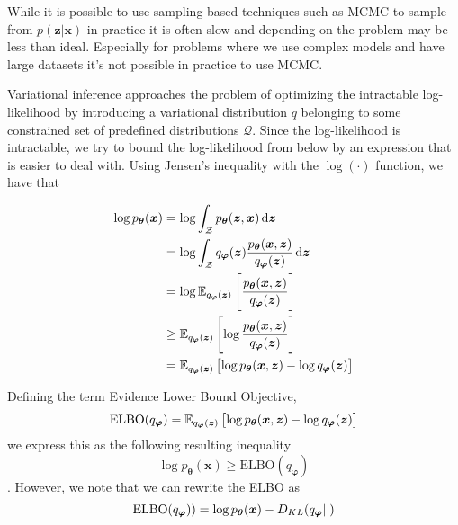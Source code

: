 While it is possible to use sampling based techniques such as MCMC
\cite{brooks2011handbook} to sample from $p(\bm{z} | \bm{x})$ in practice it is
often slow and depending on the problem may be less than ideal. Especially for
problems where we use complex models and have large datasets it's not possible
in practice to use MCMC.

Variational inference approaches the problem of optimizing the intractable
log-likelihood by introducing a variational distribution $q$ belonging to some
constrained set of predefined distributions $\mathcal{Q}$. Since the
log-likelihood is intractable, we try to bound the log-likelihood from below by
an expression that is easier to deal with. Using Jensen's inequality with the
$\log( \cdot )$ function, we have that

\begin{align*}
  \log p_{\bm{\theta}}(\bm{x}) & = \log \int_{\mathcal{Z}} p_{\bm{\theta}}(\bm{z}, \bm{x}) \dif \bm{z}\\
                               & = \log \int_{\mathcal{Z}}q_{\bm{\varphi}}(\bm{z})  \frac{p_{\bm{\theta}}(\bm{x}, \bm{z})}{q_{\bm{\varphi}}(\bm{z})} \dif \bm{z} \\
                               & = \log \E_{q_{\bm{\varphi}}(\bm{z})}\left[\frac{p_{\bm{\theta}}(\bm{x}, \bm{z})}{q_{\bm{\varphi}}(\bm{z})}\right] \\
                               & \geq \E_{q_{\bm{\varphi}}(\bm{z})}\left[\log \frac{p_{\bm{\theta}}(\bm{x}, \bm{z})}{q_{\bm{\varphi}}(\bm{z})}\right] \\
                               & = \E_{q_{\bm{\varphi}}(\bm{z})}\left[\log p_{\bm{\theta}}(\bm{x}, \bm{z}) - \log q_{\bm{\varphi}}(\bm{z})\right] \\
\end{align*}

Defining the term Evidence Lower Bound Objective,
\begin{equation}
  \label{eq:ELBO}
  \text{ELBO}(q_{\bm{\varphi}}) =
  \operatorname{\mathbb{E}}_{q_{\bm{\varphi}}(\bm{z})}\left[ \log p_{\bm{\theta}}(\bm{x}, \bm{z}) - \log
    q_{\bm{\varphi}}(\bm{z}) \right]  
\end{equation}
we express this as the following resulting inequality
\begin{equation}
  \label{eq:ELBO_inequality}
  \log p_{\bm{\theta}}(\bm{x}) \geq \text{ELBO}(q_{\bm{\varphi}})
\end{equation}.
However, we note that we can rewrite the ELBO as
\begin{equation}
  \label{eq:ELBO_decomposed}
  \text{ELBO}(q_{\bm{\varphi}})) = \log p_{\bm{\theta}}(\bm{x}) - D_{KL}(q_{\bm{\varphi}} || )
\end{equation}


